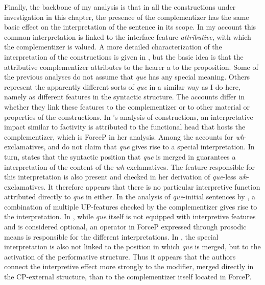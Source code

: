 Finally, the backbone of my analysis is  that in all the constructions under investigation in this chapter, the presence of the complementizer has the same basic effect on the interpretation of the sentence in its scope. In my account this common interpretation is linked to the interface feature \emph{attributive}, with which the complementizer is valued. A more detailed characterization of the interpretation of the constructions is given in , but the basic idea is that the attributive complementizer attributes to the hearer a  to the proposition. Some of the previous analyses do not assume that \emph{que} has any  special meaning. Others represent the apparently different sorts of \emph{que} in a similar way as I do here, namely as different features in the syntactic structure. The accounts differ in whether they link these features to the complementizer or to other material or properties of the constructions. In \citeauthor{Hernanz2007}'s analysis of  constructions, an interpretative impact similar to factivity is attributed to the functional head that hosts the complementizer, which is ForceP in her analysis. Among the accounts for \textit{wh}-exclamatives,  \citet{Castroviejo2006} and \citet{DemonteSoriano2009} do not claim that \emph{que} gives rise to a special interpretation. In turn,  \citet{Ambar2003} states that the syntactic position that \emph{que} is  merged in guarantees a  interpretation of the content of the \textit{wh}-exclamatives. The feature responsible for this interpretation is also present and checked in her derivation of \emph{que}-less \textit{wh}-exclamatives. It therefore appears  that there is  no particular interpretive function attributed directly to \emph{que}  in \citet{Ambar2003} either.  In the analysis of \emph{que}-initial sentences by \citet{Corr2016}, a combination of multiple UP-features checked by the complementizer  gives rise to the interpretation. In \citet{PrietoRigau2007}, while \emph{que} itself is not equipped with interpretive features and is considered optional,  an operator in ForceP expressed through prosodic means is  responsible for the different interpretations. In \citet{Cruschina2018}, the special interpretation is also not linked to the position in which \emph{que} is merged, but to the activation of the performative structure. Thus it appears that the authors connect the interpretive effect more strongly  to the modifier, merged directly in the CP-external structure, than to the complementizer itself located in ForceP.

